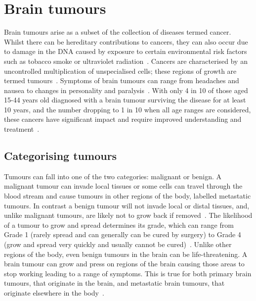 \section{Brain tumours}\label{sec:braintumours}
Brain tumours arise as a subset of the collection of diseases termed cancer. Whilst there can be hereditary contributions to cancers, they can also occur due to damage in the DNA caused by exposure to certain environmental risk factors such as tobacco smoke or ultraviolet radiation~\cite{WorldHealthOrganisation2023}. Cancers are characterised by an uncontrolled multiplication of unspecialised cells; these regions of growth are termed tumours~\cite{WorldHealthOrganisation2023}. Symptoms of brain tumours can range from headaches and nausea to changes in personality and paralysis~\cite{NationalHealthService2023}. With only 4 in 10 of those aged 15-44 years old diagnosed with a brain tumour surviving the disease for at least 10 years, and the number dropping to 1 in 10 when all age ranges are considered, these cancers have significant impact and require improved understanding and treatment~\cite{CancerResearchUK2023}.

\subsection{Categorising tumours} 
Tumours can fall into one of the two categories: malignant or benign. A malignant tumour can invade local tissues or some cells can travel through the blood stream and cause tumours in other regions of the body, labelled metastatic tumours. In contrast a benign tumour will not invade local or distal tissues, and, unlike malignant tumours, are likely not to grow back if removed~\cite{Institute2021}. The likelihood of a tumour to grow and spread determines its grade, which can range from Grade 1 (rarely spread and can generally can be cured by surgery) to Grade 4 (grow and spread very quickly and usually cannot be cured)~\cite{Institute2023}. Unlike other regions of the body, even benign tumours in the brain can be life-threatening. A brain tumour can grow and press on regions of the brain causing those areas to stop working leading to a range of symptoms. This is true for both primary brain tumours, that originate in the brain, and metastatic brain tumours, that originate elsewhere in the body~\cite{Institute2021}.

